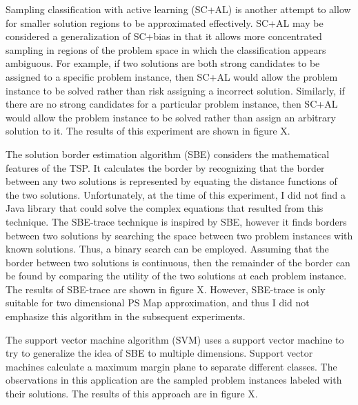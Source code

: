 \documentclass[12pt]{report}
\begin{document}
Sampling classification with active learning (SC+AL) is another attempt to allow for smaller solution regions to be approximated effectively.  SC+AL may be considered a generalization of SC+bias in that it allows more concentrated sampling in regions of the problem space in which the classification appears ambiguous.  For example, if two solutions are both strong candidates to be assigned to a specific problem instance, then SC+AL would allow the problem instance to be solved rather than risk assigning a incorrect solution.  Similarly, if there are no strong candidates for a particular problem instance, then SC+AL would allow the problem instance to be solved rather than assign an arbitrary solution to it.  The results of this experiment are shown in figure X.

The solution border estimation algorithm (SBE) considers the mathematical features of the TSP.  It calculates the border by recognizing that the border between any two solutions is represented by equating the distance functions of the two solutions.  Unfortunately, at the time of this experiment, I did not find a Java library that could solve the complex equations that resulted from this technique.  The SBE-trace technique is inspired by SBE, however it finds borders between two solutions by searching the space between two problem instances with known solutions.  Thus, a binary search can be employed.  Assuming that the border between two solutions is continuous, then the remainder of the border can be found by comparing the utility of the two solutions at each problem instance.  The results of SBE-trace are shown in figure X.  However, SBE-trace is only suitable for two dimensional PS Map approximation, and thus I did not emphasize this algorithm in the subsequent experiments.

The support vector machine algorithm (SVM) uses a support vector machine to try to generalize the idea of SBE to multiple dimensions.  Support vector machines calculate a maximum margin plane to separate different classes.  The observations in this application are the sampled problem instances labeled with their solutions.  The results of this approach are in figure X.
\end{document}
